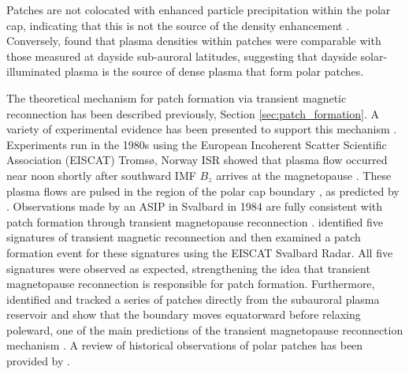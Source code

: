 
Patches are not colocated with enhanced particle precipitation within the polar cap, indicating that this is not the source of the density enhancement \citep{Weber1984}.  Conversely, \citet{Buchau1985} found that plasma densities within patches were comparable with those measured at dayside sub-auroral latitudes, suggesting that dayside solar-illuminated plasma is the source of dense plasma that form polar patches.

The theoretical mechanism for patch formation via transient magnetic reconnection has been described previously, Section \ref{sec:patch_formation}.  A variety of experimental evidence has been presented to support this mechanism \citep{Cowley1998,Carlson2002}.  Experiments run in the 1980s using the European Incoherent Scatter Scientific Association (EISCAT) Troms\o, Norway ISR showed that plasma flow occurred near noon shortly after southward IMF \(B_z\) arrives at the magnetopause \citep{Etemadi1988,Todd1988}.  These plasma flows are pulsed in the region of the polar cap boundary \citep{Lockwood1993a,Lockwood1993b}, as predicted by \citet{Cowley1991}.  Observations made by an ASIP in Svalbard in 1984 are fully consistent with patch formation through transient magnetopause reconnection \citep{Carlson1996,Carlson2002}.  \citet{Carlson2004} identified five signatures of transient magnetic reconnection and then examined a patch formation event for these signatures using the EISCAT Svalbard Radar.  All five signatures were observed as expected, strengthening the idea that transient magnetopause reconnection is responsible for patch formation.  Furthermore, \citet{Carlson2006} identified and tracked a series of patches directly from the subauroral plasma reservoir and show that the boundary moves equatorward before relaxing poleward, one of the main predictions of the transient magnetopause reconnection mechanism \citep{Lockwood1992b}.  A review of historical observations of polar patches has been provided by \citet{Crowley1996}.



